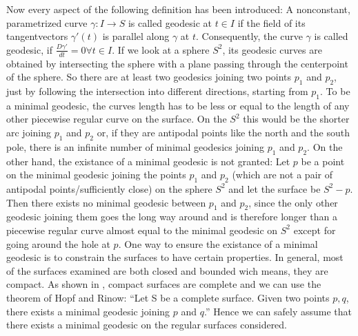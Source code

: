Now every aspect of the following definition has been introduced:
A nonconstant, parametrized curve $\gamma: I \rightarrow S$ is called geodesic at $t \in I$ if the field of its tangentvectors $\gamma'(t)$ is parallel along $\gamma$ at $t$.
Consequently, the curve $\gamma$ is called geodesic, if $\frac{D\gamma'}{dt} = 0 \forall t \in I$.
\cite[238-246]{do1976differential}
If we look at a sphere $S^2$, its geodesic curves are obtained by intersecting the sphere with a plane passing through the centerpoint of the sphere.
So there are at least two geodesics joining two points $p_1$ and $p_2$, just by following the intersection into different directions, starting from $p_1$.
To be a minimal geodesic, the curves length has to be less or equal to the length of any other piecewise regular curve on the surface.
On the $S^2$ this would be the shorter arc joining $p_1$ and $p_2$ or, if they are antipodal points like the north and the south pole, there is an infinite number of minimal geodesics joining $p_1$ and $p_2$.
On the other hand, the existance of a minimal geodesic is not granted:
Let $p$ be a point on the minimal geodesic joining the points $p_1$ and $p_2$ (which are not a pair of antipodal points/sufficiently close) on the sphere $S^2$ and let the surface be $S^2-{p}$.
Then there exists no minimal geodesic between $p_1$ and $p_2$, since the only other geodesic joining them goes the long way around and is therefore longer than a piecewise regular curve almost equal to the minimal geodesic on $S^2$ except for going around the hole at $p$.
One way to ensure the existance of a minimal geodesic is to constrain the surfaces to have certain properties.
In general, most of the surfaces examined are both closed and bounded wich means, they are compact.
As shown in \cite[331-332]{do1976differential}, compact surfaces are complete and we can use the theorem of Hopf and Rinow:
``Let S be a complete surface. Given two points $p,q$, there exists a minimal geodesic joining $p$ and $q$.'' \cite[333]{do1976differential}
Hence we can safely assume that there exists a minimal geodesic on the regular surfaces considered.
